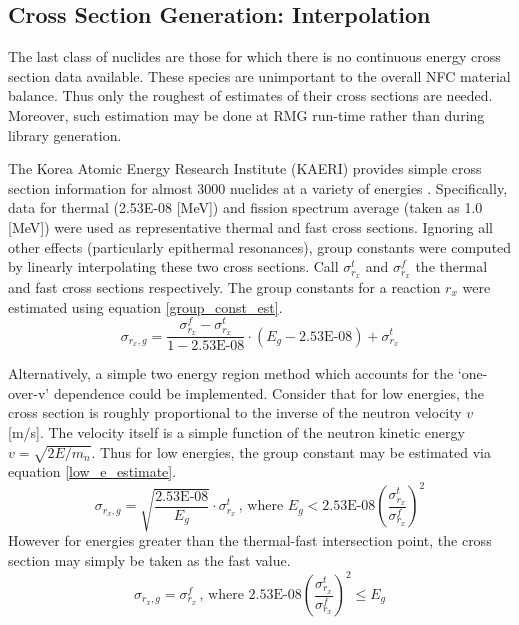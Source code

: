 \subsection{Cross Section Generation: Interpolation}
\label{mg:xs_gen_interpolation}
The last class of nuclides are those for which there is no continuous energy cross section data 
available.  These species are unimportant to the overall NFC material balance. 
Thus only the roughest of estimates of their cross sections are needed.  Moreover, such estimation 
may be done at RMG run-time rather than during library generation.

The Korea Atomic Energy Research Institute (KAERI) provides simple cross section information
for almost 3000 nuclides at a variety of energies \cite{KAER2000}.  Specifically, data for
thermal (2.53E-08 [MeV]) and fission spectrum average (taken as 1.0 [MeV]) were used as representative
thermal and fast cross sections.  Ignoring all other effects (particularly epithermal resonances), 
group constants were computed by linearly interpolating these two cross sections.  Call 
$\sigma_{r_x}^t$ and $\sigma_{r_x}^f$ the thermal and fast cross sections respectively.  The group
constants for a reaction $r_x$ were estimated using equation \ref{group_const_est}.
\begin{equation}
\label{group_const_est}
\sigma_{r_x,g} = \frac{\sigma_{r_x}^f - \sigma_{r_x}^t}{1 - \mbox{2.53E-08}} \cdot (E_g - \mbox{2.53E-08}) + \sigma_{r_x}^t
\end{equation}

Alternatively, a simple two energy region method which accounts for the `one-over-v' dependence
could be implemented.  Consider that for low energies, the cross section is roughly proportional 
to the inverse of the neutron velocity $v$ [m/s].  The velocity itself is a simple function of 
the neutron kinetic energy $v = \sqrt{2E/m_n}$.  Thus for low energies, the group constant may 
be estimated via equation \ref{low_e_estimate}.
\begin{equation}
\label{low_e_estimate}
\sigma_{r_x,g} = \sqrt{\frac{\mbox{2.53E-08}}{E_g}} \cdot \sigma_{r_x}^t \, \mbox{, where } E_g < \mbox{2.53E-08} \left(\frac{\sigma_{r_x}^t}{\sigma_{r_x}^f}\right)^2
\end{equation}
However for energies greater than the thermal-fast intersection point, the cross section may simply be taken as 
the fast value.
\begin{equation}
\label{low_e_estimate}
\sigma_{r_x,g} = \sigma_{r_x}^f \, \mbox{, where } \mbox{2.53E-08} \left(\frac{\sigma_{r_x}^t}{\sigma_{r_x}^f}\right)^2 \le E_g
\end{equation}





